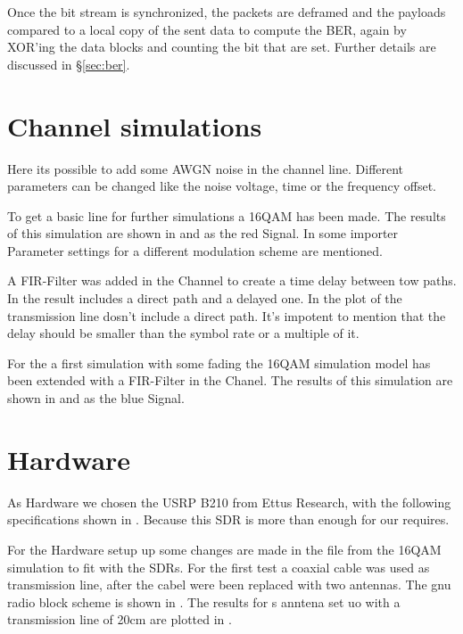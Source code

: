 Once the bit stream is synchronized, the packets are deframed and the payloads compared to a local copy of the sent data to compute the BER, again by XOR'ing the data blocks and counting the bit that are set. Further details are discussed in \S\ref{sec:ber}.

\section{Channel simulations}

Here its possible to add some AWGN noise in the channel line. Different parameters can be changed like the noise voltage, time or the frequency offset.


To get a basic line for further simulations a 16QAM has been made. The results of this simulation are shown in  and  as the red Signal. In  some importer Parameter settings for a different modulation scheme are mentioned.

A FIR-Filter was added in the Channel to create a time delay between tow paths. In  the result includes a direct path and a delayed one. In the plot of  the transmission line dosn't include a direct path. It's impotent to mention that the delay should be smaller than the symbol rate or a multiple of it. 

For the a first simulation with some fading the 16QAM simulation model has been extended with a FIR-Filter in the Chanel. The results of this simulation are shown in  and  as the blue Signal.


\section{Hardware}

As Hardware we chosen the USRP B210 from Ettus Research, with the following specifications shown in . Because this SDR is more than enough for our requires.

For the Hardware setup up some changes are made in the file from the 16QAM simulation to fit with the SDRs. For the first test a coaxial cable was used as transmission line, after the cabel were been replaced with two antennas. The gnu radio block scheme is shown in . The results for s anntena set uo with a transmission line of 20cm  are plotted in .

